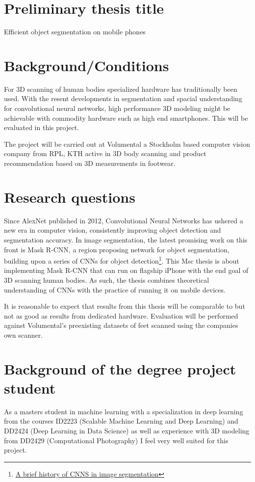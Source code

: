 \documentclass[11pt]{article}
\author{Axel Demborg}
\date{\today}
\title{}
\begin{document}
\tableofcontents

\section{Preliminary thesis title}
\label{sec:orgc8faeb1}
Efficient object segmentation on mobile phones

\section{Background/Conditions}
\label{sec:orgfbf0f0e}
For 3D scanning of human bodies specialized hardware has traditionally been used. With the resent developments in segmentation and spacial understanding for convolutional neural networks, high performance 3D modeling might be achievable with commodity hardware such as high end smartphones. This will be evaluated in this project.

The project will be carried out at Volumental a Stockholm based computer vision company from RPL, KTH active in 3D body scanning and product recommendation based on 3D measurements in footwear.

\section{Research questions}
\label{sec:org77a8a17}
Since AlexNet published in 2012, Convolutional Neural Networks has
ushered a new era in computer vision, consistently improving object
detection and segmentation accuracy. In image segmentation, the latest
promising work on this front is Mask R-CNN, a region proposing network
for object segmentation, building upon a series of CNNs for object
detection\footnote{\href{https://blog.athelas.com/a-brief-history-of-cnns-in-image-segmentation-from-r-cnn-to-mask-r-cnn-34ea83205de4}{A brief history of CNNS in image segmentation}}. This Msc thesis is about implementing Mask R-CNN that
can run on flagship iPhone with the end goal of 3D scanning human
bodies. As such, the thesis combines theoretical understanding of CNNs
with the practice of running it on mobile devices.

It is reasonable to expect that results from this thesis will be comparable to but not as good as results from dedicated hardware. Evaluation will be performed against Volumental's preexisting datasets of feet scanned using the companies own scanner.

\section{Background of the degree project student}
\label{sec:org416048e}
As a masters student in machine learning with a specialization in deep learning from the courses ID2223 (Scalable Machine Learning and Deep Learning) and DD2424 (Deep Learning in Data Science) as well as experience with 3D modeling from DD2429 (Computational Photography) I feel very well suited for this project.
\end{document}
